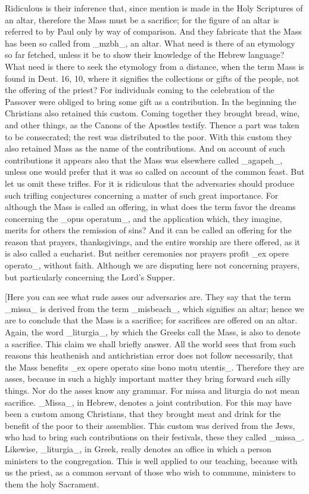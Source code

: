 Ridiculous is their inference that, since mention is made in the Holy
Scriptures of an altar, therefore the Mass must be a sacrifice; for
the figure of an altar is referred to by Paul only by way of
comparison.  And they fabricate that the Mass has been so called from
_mzbh_, an altar.  What need is there of an etymology so far fetched,
unless it be to show their knowledge of the Hebrew language?  What
need is there to seek the etymology from a distance, when the term
Mass is found in Deut. 16, 10, where it signifies the collections or
gifts of the people, not the offering of the priest?  For individuals
coming to the celebration of the Passover were obliged to bring some
gift as a contribution.  In the beginning the Christians also
retained this custom.  Coming together they brought bread, wine, and
other things, as the Canons of the Apostles testify.  Thence a part
was taken to be consecrated; the rest was distributed to the poor.
With this custom they also retained Mass as the name of the
contributions.  And on account of such contributions it appears also
that the Mass was elsewhere called _agapeh_, unless one would prefer
that it was so called on account of the common feast.  But let us
omit these trifles.  For it is ridiculous that the adversaries should
produce such trifling conjectures concerning a matter of such great
importance.  For although the Mass is called an offering, in what
does the term favor the dreams concerning the _opus operatum_, and
the application which, they imagine, merits for others the remission
of sins?  And it can be called an offering for the reason that
prayers, thanksgivings, and the entire worship are there offered, as
it is also called a eucharist.  But neither ceremonies nor prayers
profit _ex opere operato_, without faith.  Although we are disputing
here not concerning prayers, but particularly concerning the Lord's
Supper.

[Here you can see what rude asses our adversaries are.  They say that
the term _missa_ is derived from the term _misbeach_, which signifies
an altar; hence we are to conclude that the Mass is a sacrifice; for
sacrifices are offered on an altar.  Again, the word _liturgia_, by
which the Greeks call the Mass, is also to denote a sacrifice.  This
claim we shall briefly answer.  All the world sees that from such
reasons this heathenish and antichristian error does not follow
necessarily, that the Mass benefits _ex opere operato sine bono motu
utentis_.  Therefore they are asses, because in such a highly
important matter they bring forward such silly things.  Nor do the
asses know any grammar.  For missa and liturgia do not mean sacrifice.
_Missa_, in Hebrew, denotes a joint contribution.  For this may have
been a custom among Christians, that they brought meat and drink for
the benefit of the poor to their assemblies.  This custom was derived
from the Jews, who had to bring such contributions on their festivals,
these they called _missa_.  Likewise, _liturgia_, in Greek, really
denotes an office in which a person ministers to the congregation.
This is well applied to our teaching, because with us the priest, as
a common servant of those who wish to commune, ministers to them the
holy Sacrament.

